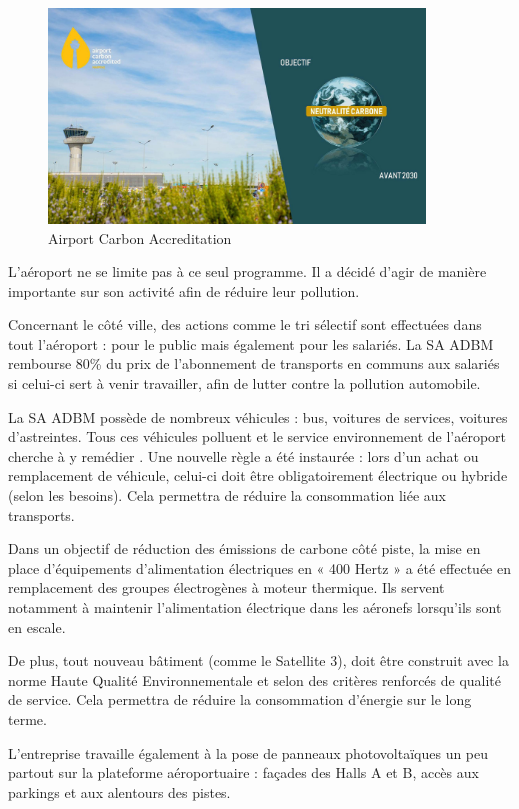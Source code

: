 \begin{figure}[hbt!]
  \centering
  \includegraphics[width=10cm]{Images/aca2030.jpg}
  \caption{Airport Carbon Accreditation}
  \label{fig:aca2030}
\end{figure}


L'aéroport ne se limite pas à ce seul programme. Il a décidé d'agir de manière importante sur son activité afin de réduire leur pollution.


Concernant le côté ville, des actions comme le tri sélectif sont effectuées dans tout l'aéroport : pour le public mais également pour les salariés. La SA ADBM rembourse 80\% du prix de l'abonnement de transports en communs aux salariés si celui-ci sert à venir travailler, afin de lutter contre la pollution automobile.


La SA ADBM possède de nombreux véhicules : bus, voitures de services, voitures d'astreintes. Tous ces véhicules polluent et le service environnement de l'aéroport cherche à y remédier . Une nouvelle règle a été instaurée : lors d'un achat ou remplacement de véhicule, celui-ci doit être obligatoirement électrique ou hybride (selon les besoins). Cela permettra de réduire la consommation liée aux transports.\newline


Dans un objectif de réduction des émissions de carbone côté piste, la mise en place d’équipements d’alimentation électriques en « 400 Hertz » a été effectuée en remplacement des groupes électrogènes à moteur thermique. Ils servent notamment à maintenir l'alimentation électrique dans les aéronefs lorsqu'ils sont en escale.


De plus, tout nouveau bâtiment (comme le Satellite 3), doit être construit avec la norme Haute Qualité Environnementale et selon des critères renforcés de qualité de service. Cela permettra de réduire la consommation d'énergie sur le long terme.\newline


L'entreprise travaille également à la pose de panneaux photovoltaïques un peu partout sur la plateforme aéroportuaire : façades des Halls A et B, accès aux parkings et aux alentours des pistes.\newline


